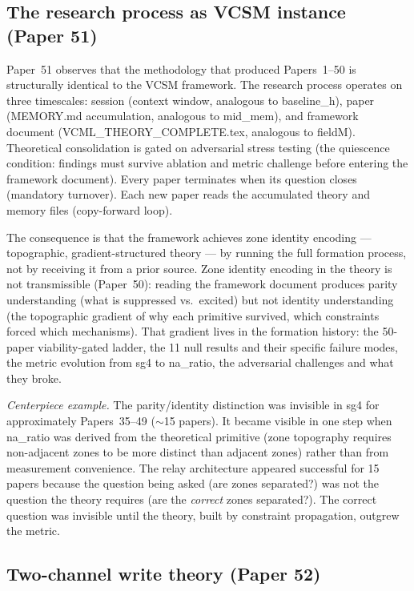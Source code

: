 \documentclass[11pt]{article}
\begin{document}
\subsection{The research process as VCSM instance (Paper 51)}

Paper~51 observes that the methodology that produced Papers~1--50 is
structurally identical to the VCSM framework.
The research process operates on three timescales:
session (context window, analogous to baseline\_h),
paper (MEMORY.md accumulation, analogous to mid\_mem),
and framework document (VCML\_THEORY\_COMPLETE.tex, analogous to fieldM).
Theoretical consolidation is gated on adversarial stress testing
(the quiescence condition: findings must survive ablation and metric challenge
before entering the framework document).
Every paper terminates when its question closes (mandatory turnover).
Each new paper reads the accumulated theory and memory files (copy-forward loop).

The consequence is that the framework achieves zone identity encoding ---
topographic, gradient-structured theory --- by running the full formation process,
not by receiving it from a prior source.
Zone identity encoding in the theory is not transmissible (Paper~50):
reading the framework document produces parity understanding (what is
suppressed vs.\ excited) but not identity understanding (the topographic gradient
of why each primitive survived, which constraints forced which mechanisms).
That gradient lives in the formation history: the 50-paper viability-gated ladder,
the 11 null results and their specific failure modes, the metric evolution
from sg4 to na\_ratio, the adversarial challenges and what they broke.

\textit{Centerpiece example.}
The parity/identity distinction was invisible in sg4 for approximately
Papers~35--49 ($\sim$15 papers).
It became visible in one step when na\_ratio was derived from the theoretical
primitive (zone topography requires non-adjacent zones to be more distinct
than adjacent zones) rather than from measurement convenience.
The relay architecture appeared successful for 15 papers because the question
being asked (are zones separated?) was not the question the theory requires
(are the \emph{correct} zones separated?).
The correct question was invisible until the theory, built by constraint
propagation, outgrew the metric.

\subsection{Two-channel write theory (Paper 52)}
\label{subsec:paper52}
\end{document}
